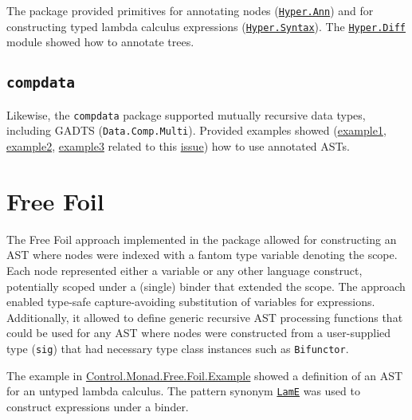 The package provided primitives for annotating nodes (\href{https://hackage.haskell.org/package/hypertypes-0.2.2/docs/Hyper-Combinator-Ann.html}{\texttt{Hyper.Ann}}) and for constructing typed lambda calculus expressions (\href{https://hackage.haskell.org/package/hypertypes-0.2.2/docs/Hyper-Syntax.html}{\texttt{Hyper.Syntax}}). The \href{https://github.com/lamdu/hypertypes/blob/06cf48ef9c85c54cbe722a448754cb89931b23e7/src/Hyper/Diff.hs}{\texttt{Hyper.Diff}} module showed how to annotate trees.

\subsection{\texttt{compdata}}
\label{chap:LiteratureReview:sec:AstRepresentations:Compdata}

Likewise, the \texttt{compdata} package \cite{compdata-hackage} supported mutually recursive data types, including GADTS (\texttt{Data.Comp.Multi}).
Provided examples showed (\href{https://github.com/pa-ba/compdata/blob/e916a9ae847b37d7932669f9365de987d09fd9e0/src/Data/Comp/Multi.hs#L322
}{example1}, \href{https://github.com/pa-ba/compdata/blob/e916a9ae847b37d7932669f9365de987d09fd9e0/examples/Examples/Multi/Desugar.hs}{example2}, \href{https://gist.github.com/liarokapisv/bb857a23ecd9df945690f73e0acfbe80}{example3} related to this \href{https://github.com/pa-ba/compdata/issues/35}{issue}) how to use annotated ASTs.

\section{Free Foil}
\label{chap:LiteratureReview:sec:AstRepresentations:FreeFoil}

The Free Foil \cite{kudasov-free-2024} approach implemented in the \cite{free-foil-hackage} package allowed for constructing an AST where nodes were indexed with a fantom type variable denoting the scope. Each node represented either a variable or any other language construct, potentially scoped under a (single) binder that extended the scope. The approach enabled type-safe capture-avoiding substitution of variables for expressions. Additionally, it allowed to define generic recursive AST processing functions that could be used for any AST where nodes were constructed from a user-supplied type (\texttt{sig}) that had necessary type class instances such as \texttt{Bifunctor}.

The example in \href{https://hackage.haskell.org/package/free-foil-0.2.0/docs/Control-Monad-Free-Foil-Example.html}{Control.Monad.Free.Foil.Example} showed a definition of an AST for an untyped lambda calculus. The pattern synonym \href{https://hackage.haskell.org/package/free-foil-0.2.0/docs/src/Control.Monad.Free.Foil.Example.html#LamE}{\texttt{LamE}} was used to construct expressions under a binder.

